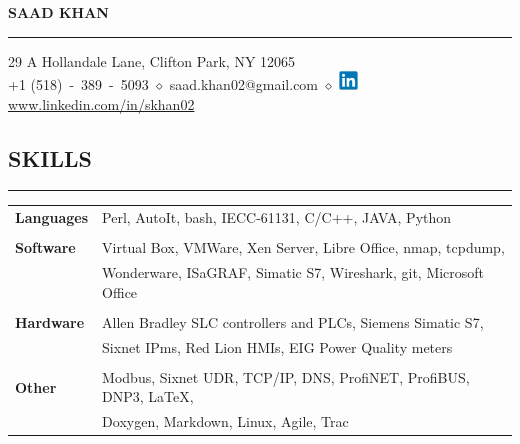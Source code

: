\documentclass{article}
\begin{document}
%
\begin{center}
    {\MakeUppercase{\huge\bf Saad Khan}} \\
    \bigskip
    \hrule
    \bigskip
    29 A Hollandale Lane, Clifton Park, NY 12065 \\
    +1 (518)~-~389~-~5093
    $\diamond$
    saad.khan02@gmail.com
    $\diamond$
    \href{https://www.linkedin.com/in/skhan02}
         {\includegraphics[width=5mm]{linkedin.png} www.linkedin.com/in/skhan02}
    \\
    \bigskip
\end{center}

%
\subsection*{\MakeUppercase{\bf Skills}}
    \hrule
    \bigskip
    \begin{tabular}{l l}
    {\bfseries Languages} &
    Perl, AutoIt, bash, IECC-61131, C/C++, JAVA, Python \\
    \\
    {\bfseries Software} &
    Virtual Box, VMWare, Xen Server, Libre Office, nmap, tcpdump, \\
    &
    Wonderware, ISaGRAF, Simatic S7, Wireshark, git, Microsoft Office \\
    \\
    {\bfseries Hardware} &
    Allen Bradley SLC controllers and PLCs, Siemens Simatic S7, \\
    &
    Sixnet IPms, Red Lion HMIs, EIG Power Quality meters \\
    \\
    {\bfseries Other} &
    Modbus, Sixnet UDR, TCP/IP, DNS, ProfiNET, ProfiBUS, DNP3, \LaTeX, \\
    &
    Doxygen, Markdown, Linux, Agile, Trac \\
    \end{tabular}
    \bigskip

%
\end{document}
